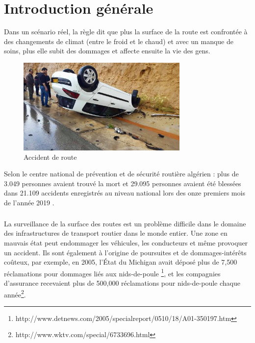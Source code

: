 \renewcommand\labelitemi{-}
\renewcommand\labelitemii{$\circ$}
\renewcommand {\thesection}{\arabic{section}}

\chapter*{Introduction générale}
    Dans un scénario réel, la règle dit que plus la surface de la route est confrontée
     à des changements de climat (entre le froid et le chaud) et avec un manque de soins, 
plus elle subit des dommages et affecte ensuite la vie des gens.
\begin{figure}[h!]
  \center
  \includegraphics[width=0.75\textwidth]{Images/chapter1/accident.jpg}
 \caption{Accident de route}
 \label{fig:Accident}
  \end{figure}
Selon le centre national de prévention et de sécurité routière algérien : 
plus de 3.049 personnes avaient trouvé la mort et 29.095 personnes avaient été blessées
 dans 21.109 accidents enregistrés au niveau national lors des onze premiers mois de l'année 2019  \cite{nassimaAccidentsRouteAlger}.


\paragraph{} 
La surveillance de la surface des routes est un problème difficile dans le domaine des 
infrastructures de transport routier dans le monde entier. Une zone en mauvais état peut 
endommager les véhicules, les conducteurs et même provoquer un accident. 
Ils sont également à l'origine de poursuites et de dommages-intérêts coûteux, par exemple, 
en 2005, l'État du Michigan avait déposé plus de 7,500 réclamations pour dommages liés 
aux nids-de-poule \footnote{http://www.detnews.com/2005/specialreport/0510/18/A01-350197.htm}, et les 
compagnies d'assurance recevaient plus de 500,000 réclamations pour nids-de-poule chaque 
année\footnote{http://www.wktv.com/special/6733696.html}.

